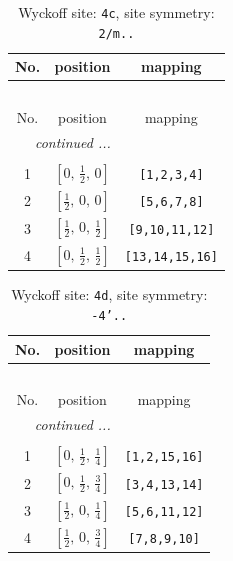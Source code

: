\documentclass[fleqn,8pt]{jsarticle}
\begin{document}
\renewcommand{\arraystretch}{1.2}
\begin{longtable}{ccc}
\caption{Wyckoff site: {\tt 4c}, site symmetry: {\tt 2/m..}}
 \\
 \hline \hline
No. & position & mapping \\ \hline \endfirsthead

\multicolumn{2}{l}{\tablename\ \thetable{}} \\
 \hline \hline
No. & position & mapping \\ \hline \endhead

 \hline \hline
\multicolumn{2}{r}{\footnotesize\it continued ...} \\ \endfoot

 \hline \hline
\multicolumn{2}{r}{} \\ \endlastfoot

1 & $\left[ 0,\, \frac{1}{2},\, 0 \right]$ & {\tt [1,2,3,4]} \\ \hline
2 & $\left[ \frac{1}{2},\, 0,\, 0 \right]$ & {\tt [5,6,7,8]} \\ \hline
3 & $\left[ \frac{1}{2},\, 0,\, \frac{1}{2} \right]$ & {\tt [9,10,11,12]} \\ \hline
4 & $\left[ 0,\, \frac{1}{2},\, \frac{1}{2} \right]$ & {\tt [13,14,15,16]} \\
\end{longtable}
\renewcommand{\arraystretch}{1.2}
\begin{longtable}{ccc}
\caption{Wyckoff site: {\tt 4d}, site symmetry: {\tt -4'..}}
 \\
 \hline \hline
No. & position & mapping \\ \hline \endfirsthead

\multicolumn{2}{l}{\tablename\ \thetable{}} \\
 \hline \hline
No. & position & mapping \\ \hline \endhead

 \hline \hline
\multicolumn{2}{r}{\footnotesize\it continued ...} \\ \endfoot

 \hline \hline
\multicolumn{2}{r}{} \\ \endlastfoot

1 & $\left[ 0,\, \frac{1}{2},\, \frac{1}{4} \right]$ & {\tt [1,2,15,16]} \\ \hline
2 & $\left[ 0,\, \frac{1}{2},\, \frac{3}{4} \right]$ & {\tt [3,4,13,14]} \\ \hline
3 & $\left[ \frac{1}{2},\, 0,\, \frac{1}{4} \right]$ & {\tt [5,6,11,12]} \\ \hline
4 & $\left[ \frac{1}{2},\, 0,\, \frac{3}{4} \right]$ & {\tt [7,8,9,10]} \\
\end{longtable}
\end{document}
